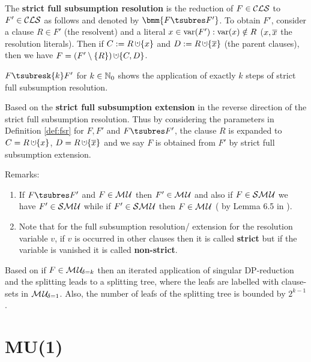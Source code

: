\documentclass{article}
\begin{document}
\begin{defi}\label{def:fsr}
\cite{KullmannZhao2010Extremal} The \textbf{strict full subsumption resolution} is the reduction of $F \in \mathcal{CLS}$ to $F'\in \mathcal{CLS}$ as follows and denoted by $\bmm{F \tsubres F'}$. To obtain $F'$, consider a clause $R \in F'$ (the resolvent) and a literal $x \in \operatorname{var}(F'):\operatorname{var}(x) \notin R$ ($x, \overline{x}$ the resolution literals). Then if $C := R \addcup \set{x}$ and $D := R \addcup \set{\ol{x}}$ (the parent clauses), then we have $F = (F' \sm \set{R}) \addcup \set{C,D}$.

$F \tsubresk{k} F'$ for $k \in \mathbb{N}_0$ shows the application of exactly $k$ steps of strict full subsumption resolution. 
\end{defi}
   
\begin{defi}\label{def:fse}
Based on \cite{KullmannZhao2010Extremal} the \textbf{strict full subsumption extension} in the reverse direction of the strict full subsumption resolution. Thus by considering the parameters in Definition \ref{def:fsr} for $F, F'$ and $F \tsubres F'$, the clause $R$ is expanded to $C = R \addcup \set{x}$, $D = R \addcup \set{\ol{x}}$ and we say $F$ is obtained from $F'$ by strict full subsumption extension.
\end{defi}
Remarks:
  \begin{enumerate}
  \item If  $F \tsubres F'$ and $F \in \mathcal{M\hspace{0.8pt}U} $ then $ F' \in \mathcal{M\hspace{0.8pt}U}$ and also if $F \in \mathcal{S}\mathcal{M\hspace{0.8pt}U}$ we have $ F' \in \mathcal{S}\mathcal{M\hspace{0.8pt}U}$ while if $ F' \in \mathcal{S}\mathcal{M\hspace{0.8pt}U}$ then $F \in \mathcal{M\hspace{0.8pt}U} $ ( by Lemma 6.5 in \cite{KullmannZhao2010Extremal}). 
  \item Note that for the full subsumption resolution/ extension for the resolution variable $v$, if $v$ is occurred in other clauses then it is called \textbf{strict} but if the variable is vanished it is called \textbf{non-strict}.
  \end{enumerate}
  
\begin{lem}\label{lem:mu-refu-tree}
Based on \cite{KleineBuening2000SubclassesMU} if $F \in \mathcal{M\hspace{0.8pt}U}_{\!\delta=k}$ then an iterated application of singular DP-reduction and the splitting leads to a splitting tree, where the leafs are labelled with clause-sets in $\mathcal{M\hspace{0.8pt}U}_{\!\delta=1}$. Also, the number of leafs of the splitting tree is bounded by $2^{k-1}$.
\end{lem}

\section{MU(1)}
\label{sec:mu1}
\end{document}
